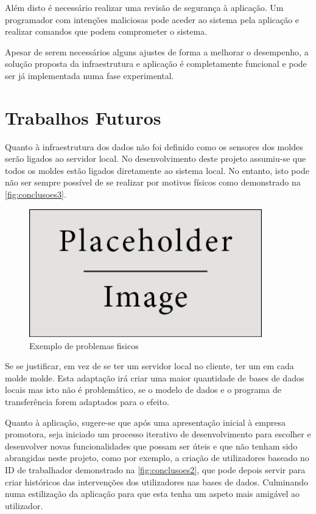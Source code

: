 \documentclass[11pt,twoside,a4paper]{report}
\begin{document}
Além disto é necessário realizar uma revisão de segurança à aplicação. Um programador com intenções maliciosas pode aceder ao sistema pela aplicação e realizar comandos que podem comprometer o sistema.\par 
Apesar de serem necessários alguns ajustes de forma a melhorar o desempenho, a solução proposta da infraestrutura e aplicação é completamente funcional e pode ser já implementada numa fase experimental.

\section{Trabalhos Futuros}
Quanto à infraestrutura dos dados não foi definido como os sensores dos moldes serão ligados ao servidor local. No desenvolvimento deste projeto assumiu-se que todos os moldes estão ligados diretamente ao sistema local. No entanto, isto pode não ser sempre possível de se realizar por motivos físicos como demonstrado na \autoref{fig:conclusoes3}.
\begin{figure}[H]
	\begin{center}
		\includegraphics[width=0.9\textwidth]{placeholder} %
		\caption{Exemplo de problemas fisicos}
		\label{fig:conclusoes3}
	\end{center}
\end{figure}
Se se justificar, em vez de se ter um servidor local no cliente, ter um em cada molde molde. Esta adaptação irá criar uma maior quantidade de bases de dados locais mas isto não é problemático, se o modelo de dados e o programa de transferência forem adaptados para o efeito.\par
Quanto à aplicação, sugere-se que após uma apresentação inicial à empresa promotora, seja iniciado um processo iterativo de desenvolvimento para escolher e desenvolver novas funcionalidades que possam ser úteis e que não tenham sido abrangidas neste projeto, como por exemplo, a criação de utilizadores baseado no ID de trabalhador demonstrado na \autoref{fig:conclusoes2}, que pode depois servir para criar históricos das intervenções dos utilizadores nas bases de dados. Culminando numa estilização da aplicação para que esta tenha um aspeto mais amigável ao utilizador.
\end{document}
